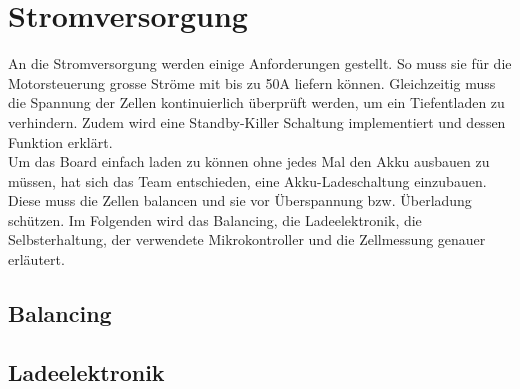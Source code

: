 \section{Stromversorgung}
\label{HW_Stromversorgung}
An die Stromversorgung werden einige Anforderungen gestellt. So muss sie für die Motorsteuerung grosse Ströme mit bis zu 50A liefern können. Gleichzeitig muss die Spannung der Zellen kontinuierlich überprüft werden, um ein Tiefentladen zu verhindern. Zudem wird eine Standby-Killer Schaltung implementiert und dessen Funktion erklärt.\\
Um das Board einfach laden zu können ohne jedes Mal den Akku ausbauen zu müssen, hat sich das Team entschieden, eine Akku-Ladeschaltung einzubauen. Diese muss die Zellen balancen und sie vor Überspannung bzw. Überladung schützen. 
Im Folgenden wird das Balancing, die Ladeelektronik, die Selbsterhaltung, der verwendete Mikrokontroller und die Zellmessung genauer erläutert.
\subsection*{Balancing}


\subsection*{Ladeelektronik}


